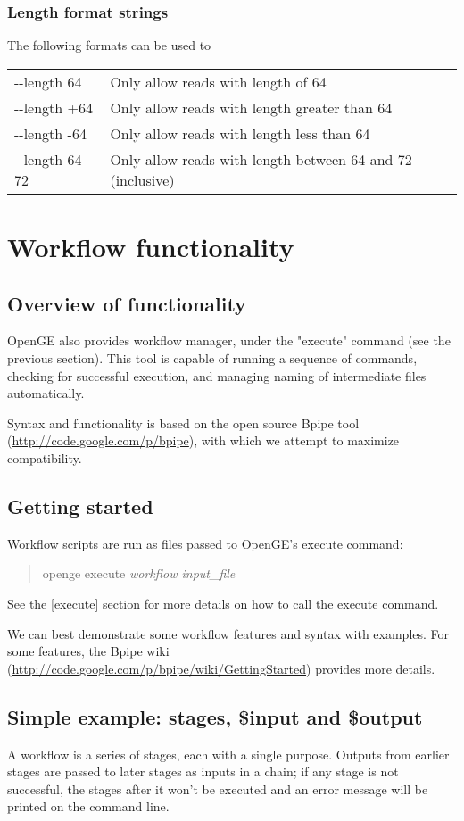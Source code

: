 \documentclass[11pt]{article}
\newcommand {\cmd}[1] {\begin{quote}#1\end{quote}}
\begin{document}
\subsubsection{Length format strings}
The following formats can be used to 
\begin{center}
\begin{tabular}{lp{3.5in}}
{-}{-}length 64&Only allow reads with length of 64\\
{-}{-}length +64&Only allow reads with length greater than 64\\
{-}{-}length -64&Only allow reads with length less than 64\\
{-}{-}length 64-72&Only allow reads with length between 64 and 72 (inclusive)\\
\end{tabular}
\end{center}

\section {Workflow functionality}
\subsection {Overview of functionality}
\label{pipeline_functionality}
OpenGE also provides workflow manager, under the "execute" command (see the previous section). This tool is capable of running a sequence of commands, checking for successful execution, and managing naming of intermediate files automatically.

Syntax and functionality is based on the open source Bpipe tool (\url{http://code.google.com/p/bpipe}), with which we attempt to maximize compatibility.

\subsection {Getting started}
Workflow scripts are run as files passed to OpenGE's execute command:

\cmd{openge execute \textit{workflow input\_file}}

See the \ref{execute} section for more details on how to call the execute command.

We can best demonstrate some workflow features and syntax with examples. For some features, the Bpipe wiki (\url{http://code.google.com/p/bpipe/wiki/GettingStarted}) provides more details.

\subsection {Simple example: stages, \$input and \$output}
A workflow is a series of stages, each with a single purpose. Outputs from earlier stages are passed to later stages as inputs in a chain; if any stage is not successful, the stages after it won't be executed and an error message will be printed on the command line.
\end{document}

